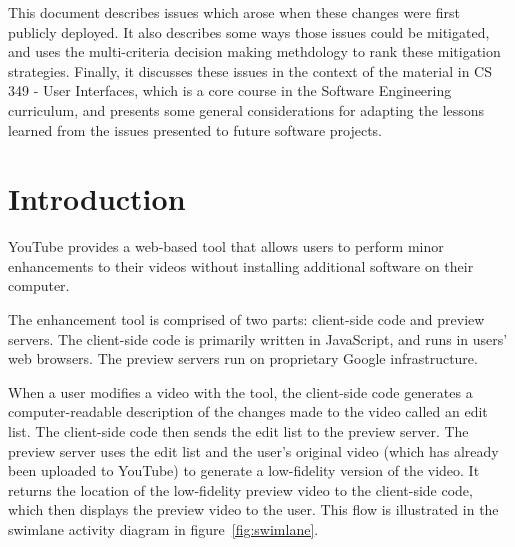 \documentclass[se,resubmit]{uw-wkrpt}
\begin{document}
This document describes issues which arose when these changes were first
publicly deployed. It also describes some ways those issues could be
mitigated, and uses the multi-criteria decision making methdology to rank
these mitigation strategies. Finally, it discusses these issues in the
context of the material in CS 349 - User Interfaces, which is a core
course in the Software Engineering curriculum, and presents some general
considerations for adapting the lessons learned from the issues presented
to future software projects.

\tableofcontents
\listoffigures
\listoftables

\mainmatter

\section{Introduction}\label{sec:intro}
YouTube provides a web-based tool that allows users to perform minor
enhancements to their videos without installing additional software on
their computer.

The enhancement tool is comprised of two parts: client-side code and
preview servers. The client-side code is primarily written in JavaScript,
and runs in users' web browsers. The preview servers run on proprietary
Google infrastructure.

When a user modifies a video with the tool, the client-side code generates
a computer-readable description of the changes made to the video called an
edit list. The client-side code then sends the edit list to the preview
server. The preview server uses the edit list and the user's original
video (which has already been uploaded to YouTube) to generate a
low-fidelity version of the video. It returns the location of the
low-fidelity preview video to the client-side code, which then displays
the preview video to the user. This flow is illustrated in the swimlane
activity diagram in figure~\ref{fig:swimlane}.
\end{document}
